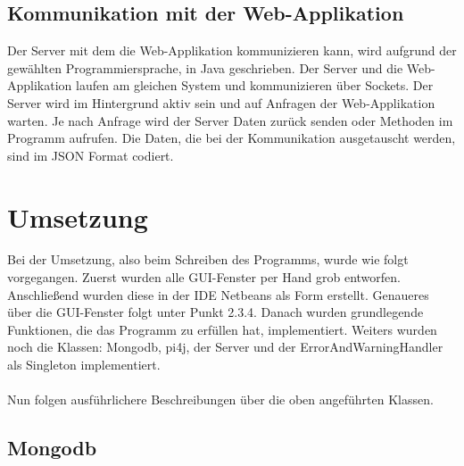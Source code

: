 \subsection{Kommunikation mit der Web-Applikation}
Der Server mit dem die Web-Applikation kommunizieren kann, wird aufgrund der gewählten Programmiersprache, in Java geschrieben. Der Server und die Web-Applikation laufen am gleichen System und kommunizieren über Sockets. Der Server wird im Hintergrund aktiv sein und auf Anfragen der Web-Applikation warten. Je nach Anfrage wird der Server Daten zurück senden oder Methoden im Programm aufrufen. Die Daten, die bei der Kommunikation ausgetauscht werden, sind im \ac{JSON} Format codiert.

\newpage

\section{Umsetzung}
Bei der Umsetzung, also beim Schreiben des Programms, wurde wie folgt vorgegangen. Zuerst wurden alle \ac{GUI}-Fenster per Hand grob entworfen. Anschließend wurden diese in der IDE Netbeans als   Form erstellt. Genaueres über die \ac{GUI}-Fenster folgt unter Punkt 2.3.4. Danach wurden grundlegende Funktionen, die das Programm zu erfüllen hat, implementiert. Weiters wurden noch die Klassen: Mongodb, \ac{pi4j}, der Server und der ErrorAndWarningHandler als Singleton implementiert. 
\\ \\ 
Nun folgen ausführlichere Beschreibungen über die oben angeführten Klassen.

\subsection{Mongodb}
